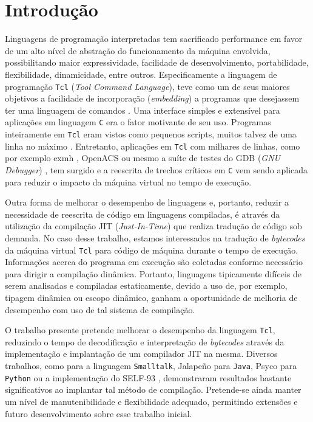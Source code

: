 \section{Introdução}

Linguagens de programação interpretadas tem sacrificado performance
em favor de um alto nível de abstração do funcionamento da máquina
envolvida, possibilitando maior expressividade, facilidade de
desenvolvimento, portabilidade, flexibilidade, dinamicidade, entre outros.
Especificamente a linguagem de programação \texttt{Tcl}
(\textit{Tool Command Language}), teve como um de seus maiores
objetivos a facilidade de incorporação (\textit{embedding}) a
programas que desejassem ter uma linguagem de comandos
\cite{ousterhout_89}. Uma interface simples e extensível para
aplicações em linguagem \texttt{C} era o fator motivante de seu uso.
Programas inteiramente em \texttt{Tcl} eram vistos como pequenos
scripts, muitos talvez de uma linha no máximo \cite{ousterhout_89}.
Entretanto, aplicações em \texttt{Tcl} com milhares de linhas,
como por exemplo exmh \cite{exmh}, OpenACS \cite{openacs} ou mesmo a
suíte de testes do GDB (\textit{GNU Debugger}) \cite{gdb_testsuite},
tem surgido e a reescrita de trechos críticos em \texttt{C} vem sendo
aplicada para reduzir o impacto da máquina virtual no tempo de execução.

Outra forma de melhorar o desempenho de linguagens e, portanto,
reduzir a necessidade de reescrita de código em linguagens compiladas,
é através da utilização da compilação JIT (\textit{Just-In-Time}) que
realiza tradução de código sob demanda. No caso desse trabalho, estamos
interessados na tradução de \textit{bytecodes} da máquina virtual
\texttt{Tcl} para código de máquina durante o tempo de execução.
Informações acerca do programa em execução são coletadas
conforme necessário para dirigir a compilação dinâmica. Portanto,
linguagens tipicamente difíceis de serem analisadas e compiladas
estaticamente, devido a uso de, por exemplo, tipagem dinâmica ou
escopo dinâmico, ganham a oportunidade de melhoria de desempenho
com uso de tal sistema de compilação.

O trabalho presente pretende melhorar o desempenho da linguagem
\texttt{Tcl}, reduzindo o tempo de decodificação e interpretação
de \textit{bytecodes} através da implementação e implantação de um
compilador JIT na mesma. Diversos trabalhos, como
\cite{deutsch84efficient} para a linguagem \texttt{Smalltalk},
Jalapeño \cite{jalapeno_1} para \texttt{Java}, Psyco \cite{psyco}
para \texttt{Python} ou a implementação do SELF-93 \cite{holzle},
demonstraram resultados bastante significativos ao implantar tal
método de compilação. Pretende-se ainda manter um nível de
manutenibilidade e flexibilidade adequado, permitindo extensões e
futuro desenvolvimento sobre esse trabalho inicial.

